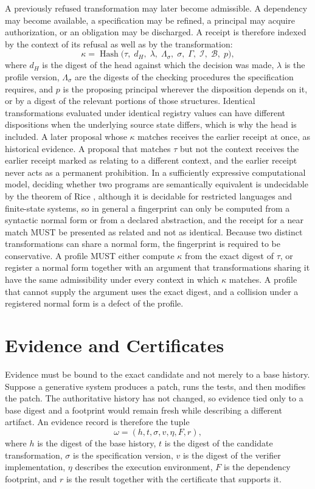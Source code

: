 \documentclass[11pt]{article}
\theoremstyle{remark}
\begin{document}
A previously refused transformation may later become admissible. A dependency may become available, a specification may be refined, a principal may acquire authorization, or an obligation may be discharged. A receipt is therefore indexed by the context of its refusal as well as by the transformation:
\[
\kappa=\operatorname{Hash}\bigl(\tau,\;d_H,\;\lambda,\;\Lambda_\sigma,\;\sigma,\;\Gamma,\;\mathcal I,\;\mathcal B,\;p\bigr),
\]
where $d_H$ is the digest of the head against which the decision was made, $\lambda$ is the profile version, $\Lambda_\sigma$ are the digests of the checking procedures the specification requires, and $p$ is the proposing principal wherever the disposition depends on it, or by a digest of the relevant portions of those structures. Identical transformations evaluated under identical registry values can have different dispositions when the underlying source state differs, which is why the head is included. A later proposal whose $\kappa$ matches receives the earlier receipt at once, as historical evidence. A proposal that matches $\tau$ but not the context receives the earlier receipt marked as relating to a different context, and the earlier receipt never acts as a permanent prohibition. In a sufficiently expressive computational model, deciding whether two programs are semantically equivalent is undecidable by the theorem of Rice \cite{rice}, although it is decidable for restricted languages and finite-state systems, so in general a fingerprint can only be computed from a syntactic normal form or from a declared abstraction, and the receipt for a near match MUST be presented as related and not as identical. Because two distinct transformations can share a normal form, the fingerprint is required to be conservative. A profile MUST either compute $\kappa$ from the exact digest of $\tau$, or register a normal form together with an argument that transformations sharing it have the same admissibility under every context in which $\kappa$ matches. A profile that cannot supply the argument uses the exact digest, and a collision under a registered normal form is a defect of the profile.

\section{Evidence and Certificates}\label{sec:evidence}

Evidence must be bound to the exact candidate and not merely to a base history. Suppose a generative system produces a patch, runs the tests, and then modifies the patch. The authoritative history has not changed, so evidence tied only to a base digest and a footprint would remain fresh while describing a different artifact. An evidence record is therefore the tuple
\[
\omega=(h,t,\sigma,v,\eta,F,r),
\]
where $h$ is the digest of the base history, $t$ is the digest of the candidate transformation, $\sigma$ is the specification version, $v$ is the digest of the verifier implementation, $\eta$ describes the execution environment, $F$ is the dependency footprint, and $r$ is the result together with the certificate that supports it.
\end{document}
